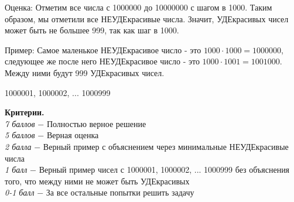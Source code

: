  Оценка: Отметим все числа с 1000000 до 10000000 с шагом в 1000. Таким образом, мы отметили все НЕУДЕкрасивые числа. Значит, УДЕкрасивых чисел может быть не большее 999, так как шаг в 1000.

Пример: Самое маленькое НЕУДЕкрасивое число - это $1000\cdot1000=1000000$, следующее же после него НЕУДЕкрасивое число - это $1000\cdot1001=1001000$. Между ними будут 999 УДЕкрасивых чисел.

1000001, 1000002, ... 1000999\par

\textbf{Критерии.} \\
\textit{7 баллов} $-$ Полностью верное решение\\
\textit{5 баллов} $-$ Верная оценка\\
\textit{2 балла} $-$ Верный пример с объяснением через минимальные НЕУДЕкрасивые числа\\
\textit{1 балл} $-$  Верный пример чисел с 1000001, 1000002, ... 1000999 без объяснения того, что между ними не может быть УДЕкрасивых\\ 
\textit{0-1 балл} $-$ За все остальные попытки решить задачу\\
